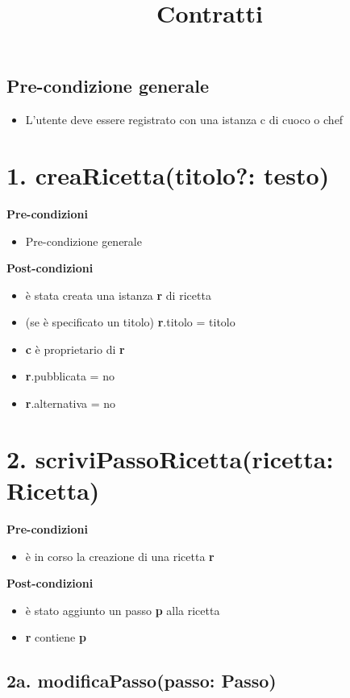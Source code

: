 \documentclass[14pt]{extarticle}
\begin{document}
\title{Contratti}
\date{}
\maketitle

\subsection*{Pre-condizione generale}
\begin{itemize}
  \item L'utente deve essere registrato con una istanza c di cuoco o chef
\end{itemize}

\section*{1. creaRicetta(titolo?: testo)}
\textbf{Pre-condizioni}
\begin{itemize}
  \item Pre-condizione generale
\end{itemize}
\textbf{Post-condizioni}
\begin{itemize}
  \item è stata creata una istanza \textbf{r} di ricetta
  \item (se è specificato un titolo) \textbf{r}.titolo = titolo
  \item \textbf{c} è proprietario di \textbf{r}
  \item \textbf{r}.pubblicata = no
  \item \textbf{r}.alternativa = no
\end{itemize}

\section*{2. scriviPassoRicetta(ricetta: Ricetta)}

\textbf{Pre-condizioni} 	
\begin{itemize}
  \item è in corso la creazione di una ricetta  \textbf{r}
\end{itemize}
\textbf{Post-condizioni}
\begin{itemize}
  \item è stato aggiunto un passo  \textbf{p} alla ricetta
  \item  \textbf{r} contiene  \textbf{p}
\end{itemize}

\subsection*{2a. modificaPasso(passo: Passo)}
\end{document}
